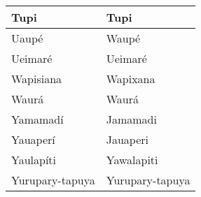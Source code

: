 \begin{center}
\begin{tabular}{ | m{12em} | m{4.2cm}| }
\hline
Tupi              	       	& Tupi \\
\hline
Uaupé             	       	& Waupé \\
\hline
Ueimaré           	       	& Ueimaré \\
\hline
Wapisiana         	       	& Wapixana \\
\hline
Waurá             	       	& Waurá \\
\hline
Yamamadí          	       	& Jamamadi \\
\hline
Yauaperí          	       	& Jauaperi \\
\hline
Yaulapíti         	       	& Yawalapiti \\
\hline
Yurupary-tapuya   	       	& Yurupary-tapuya\\
\hline
\end{tabular}
\end{center}

